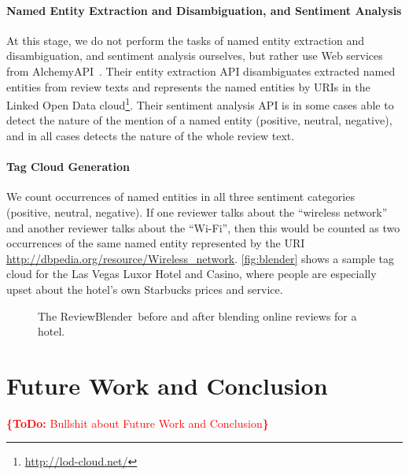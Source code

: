 \documentclass[runningheads,a4paper]{llncs}
\newcommand{\todo}[1]{\noindent\textcolor{red}{{\bf \{ToDo: }#1{\bf \}}}}
\begin{document}
\paragraph{Named Entity Extraction and Disambiguation, and Sentiment Analysis}
At this stage, we do not perform the tasks of named entity extraction and disambiguation, and sentiment analysis ourselves, but rather use Web services from AlchemyAPI~\cite{alchemyapi2011}. Their entity extraction API disambiguates extracted named entities from review texts and represents the named entities by URIs in the Linked Open Data cloud\footnote{\url{http://lod-cloud.net/}}. Their sentiment analysis API is in some cases able to detect the nature of the mention of a named entity (positive, neutral, negative), and in all cases detects the nature of the whole review text.

\paragraph{Tag Cloud Generation}
We count occurrences of named entities in all three sentiment categories (positive, neutral, negative). If one reviewer talks about the ``wireless network'' and another reviewer talks about the ``Wi-Fi'', then this would be counted as two occurrences of the same named entity represented by the URI \url{http://dbpedia.org/resource/Wireless_network}. \autoref{fig:blender} shows a sample tag cloud for the Las Vegas Luxor Hotel and Casino, where people are especially upset about the hotel's own Starbucks prices and service.

\vspace{-5mm}
\begin{figure}[h]
  \begin{center}
\hspace{10pt}
  \caption{The ReviewBlender\texttrademark \ before and after blending online reviews for a hotel.}
  \label{fig:blender}
  \end{center}  
\end{figure}

\vspace{-5mm}
\section{Future Work and Conclusion}
\todo{Bullshit about Future Work and Conclusion}

\renewcommand{\ttdefault}{cmvtt}
\renewcommand\UrlFont\tt



\end{document}
